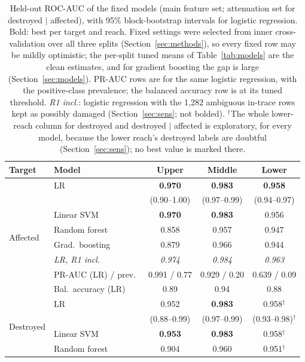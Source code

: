 \documentclass[journal,a4paper]{IEEEtran}
\begin{document}
\begin{table}[t]
\centering\footnotesize
\setlength{\tabcolsep}{2.5pt}
\caption{Held-out ROC-AUC of the fixed models (main feature set; attenuation set for destroyed $\mid$ affected), with 95\% block-bootstrap intervals for logistic regression. Bold: best per target and reach. Fixed settings were selected from inner cross-validation over all three splits (Section~\ref{sec:methods}), so every fixed row may be mildly optimistic; the per-split tuned means of Table~\ref{tab:models} are the clean estimates, and for gradient boosting the gap is large (Section~\ref{sec:models}). PR-AUC rows are for the same logistic regression, with the positive-class prevalence; the balanced accuracy row is at its tuned threshold. \emph{R1 incl.}: logistic regression with the 1,282 ambiguous in-trace rows kept as possibly damaged (Section~\ref{sec:sens}; not bolded). $^\dagger$The whole lower-reach column for destroyed and destroyed $\mid$ affected is exploratory, for every model, because the lower reach's destroyed labels are doubtful (Section~\ref{sec:sens}); no best value is marked there.}\label{tab:final}
\begin{tabular}{@{}llccc@{}}
\toprule
\textbf{Target} & \textbf{Model} & \textbf{Upper} & \textbf{Middle} & \textbf{Lower}\\
\midrule
\multirow{8}{*}{Affected} & LR & \textbf{0.970} & \textbf{0.983} & \textbf{0.958}\\
 & & {\scriptsize(0.90--1.00)} & {\scriptsize(0.97--0.99)} & {\scriptsize(0.94--0.97)}\\
 & Linear SVM & \textbf{0.970} & \textbf{0.983} & 0.956\\
 & Random forest & 0.858 & 0.957 & 0.947\\
 & Grad.\ boosting & 0.879 & 0.966 & 0.944\\
 & \emph{LR, R1 incl.} & \emph{0.974} & \emph{0.984} & \emph{0.963}\\
 & PR-AUC (LR) / prev.\ & 0.991 / 0.77 & 0.929 / 0.20 & 0.639 / 0.09\\
 & Bal.\ accuracy (LR) & 0.89 & 0.94 & 0.88\\
\midrule
\multirow{7}{*}{Destroyed} & LR & 0.952 & \textbf{0.983} & 0.958$^\dagger$\\
 & & {\scriptsize(0.88--0.99)} & {\scriptsize(0.97--0.99)} & {\scriptsize(0.93--0.98)}$^\dagger$\\
 & Linear SVM & \textbf{0.953} & \textbf{0.983} & 0.958$^\dagger$\\
 & Random forest & 0.904 & 0.960 & 0.951$^\dagger$\\

\end{tabular}
\end{table}
\end{document}
